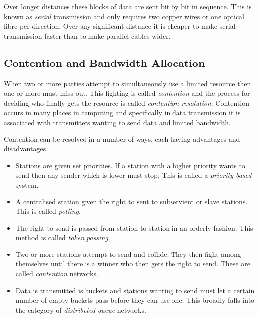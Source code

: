 Over longer distances these blocks of data are sent bit by bit in
sequence.  This is known as {\em serial} transmission and only
requires two copper wires or one optical fibre per direction.  Over
any significant distance it is cheaper to make serial transmission
faster than to make parallel cables wider.

\subsection{Contention and Bandwidth Allocation}

When two or more parties attempt to simultaneously use a limited
resource then one or more must miss out.  This fighting is called {\em
contention} and the process for deciding who finally gets the resource
is called {\em contention resolution}.  Contention occurs in many
places in computing and specifically in data transmission it is
associated with transmitters wanting to send data and limited
bandwidth.

Contention can be resolved in a number of ways, each having advantages
and disadvantages.

\begin{itemize}

\item Stations are given set priorities.  If a station with a higher
priority wants to send then any sender which is lower must stop.  This
is called a {\em priority based} system.

\item A centralised station given the right to sent to subservient or
slave stations.  This is called {\em polling}.

\item The right to send is passed from station to station in an
orderly fashion.  This method is called {\em token passing}.

\item Two or more stations attempt to send and collide.  They then
fight among themselves until there is a winner who then gets the right
to send.  These are called {\em contention} networks.

\item Data is transmitted is buckets and stations wanting to send must
let a certain number of empty buckets pass before they can use one.
This broadly falls into the category of {\em distributed queue}
networks.

\end{itemize}

